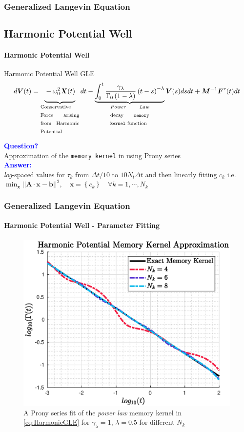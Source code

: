 \documentclass[a4paper,10pt]{beamer}
\newcommand{\BS}[1]{\boldsymbol{#1}}
\newcommand{\rb}[1]{\left( #1 \right)}
\newcommand{\norm}[1]{\left| \left| #1 \right| \right|}
\begin{document}
	\begin{frame}
		\frametitle{Generalized Langevin Equation}
		\subsection{Harmonic Potential Well}
		\framesubtitle{Harmonic Potential Well}
		\begin{block}{Harmonic Potential Well GLE}
			\footnotesize
			\begin{align}
				d\BS{V}(t) = \underbrace{\vphantom{\int_{0}^{t} \frac{\gamma_{\lambda}}{\Gamma_{0} \rb{1-\lambda}}\rb{t-s}^{-\lambda} \BS{V}(s) ds dt} -\omega^{2}_{0} \BS{X}(t)}_{\text{\begin{minipage}{0.165\linewidth}
						Conservative Force arising from Harmonic Potential
						\end{minipage}}}dt - \underbrace{\int_{0}^{t} \frac{\gamma_{\lambda}}{\Gamma_{0} \rb{1-\lambda}}\rb{t-s}^{-\lambda}}_{\text{\begin{minipage}{0.165\linewidth}
						\textit{Power Law} decay \texttt{memory kernel} function
						\end{minipage}}} \BS{V}(s) ds dt + \BS{M}^{-1} \BS{F}^{r}(t) dt
						\label{eq:HarmonicGLE}
			\end{align}
		\end{block}
		\textcolor{blue}{\textbf{Question?}} \\ Approximation of the \texttt{memory kernel} in  using Prony series \\
		\textcolor{blue}{\textbf{Answer:}} \\
		\textit{log}-spaced values for $\tau_{k}$ from $\Delta t/10$ to $10N_{t}\Delta t$ and then linearly fitting $c_{k}$ i.e. $\min_{\BS{x}} \norm{\BS{A}\cdot \BS{x}-\BS{b}}^{2}, \quad \BS{x} = \left\{ c_{k} \right\} \quad \forall k=1, \cdots, N_{k}$
	\end{frame}

	\begin{frame}
		\frametitle{Generalized Langevin Equation}
		\framesubtitle{Harmonic Potential Well - Parameter Fitting}
		\begin{figure}[H]
			\centering
			\includegraphics[width=0.725\linewidth]{./Plots/ParameterFittingExample/paramFit.eps}
			\caption{A Prony series fit of the \textit{power law} memory kernel in \cref{eq:HarmonicGLE} for
				$\gamma_{\lambda} = 1$, $\lambda = 0.5$ for different $N_{k}$}
		\end{figure}
	\end{frame}
\end{document}
